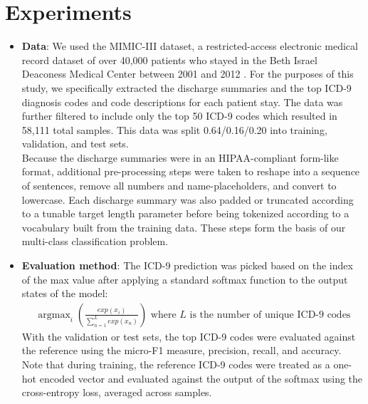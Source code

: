 \documentclass{article}
\DeclareMathOperator*{\argmax}{argmax} %
\begin{document}
\section{Experiments}
\begin{itemize}
    \item 
    		\textbf{Data}: 
    		We used the MIMIC-III dataset, a restricted-access electronic medical record dataset of over 40,000 patients who stayed in the Beth Israel Deaconess Medical Center between 2001 and 2012 \cite{johnson2016mimic}. For the purposes of this study, we specifically extracted the discharge summaries and the top ICD-9 diagnosis codes and code descriptions for each patient stay. The data was further filtered to include only the top 50 ICD-9 codes which resulted in 58,111 total samples. This data was split 0.64/0.16/0.20 into training, validation, and test sets.\\
    		Because the discharge summaries were in an HIPAA-compliant form-like format, additional pre-processing steps were taken to reshape into a sequence of sentences, remove all numbers and name-placeholders, and convert to lowercase. Each discharge summary was also padded or truncated according to a tunable target length parameter before being tokenized according to a vocabulary built from the training data. These steps form the basis of our multi-class classification problem.
    \item 
    		\textbf{Evaluation method}: The ICD-9 prediction was picked based on the index of the max value after applying a standard softmax function to the output states of the model:
    		\begin{align*}
			\argmax_{i}{(\frac{exp(x_i)}{\sum_{n=1}^{L}{exp(x_n)}})} \text{  where }L\text{ is the number of unique ICD-9 codes}
    		\end{align*}
    		With the validation or test sets, the top ICD-9 codes were evaluated against the reference using the micro-F1 measure, precision, recall, and accuracy. Note that during training, the reference ICD-9 codes were treated as a one-hot encoded vector and evaluated against the output of the softmax using the cross-entropy loss, averaged across samples. 
    		 

\end{itemize}
\end{document}

